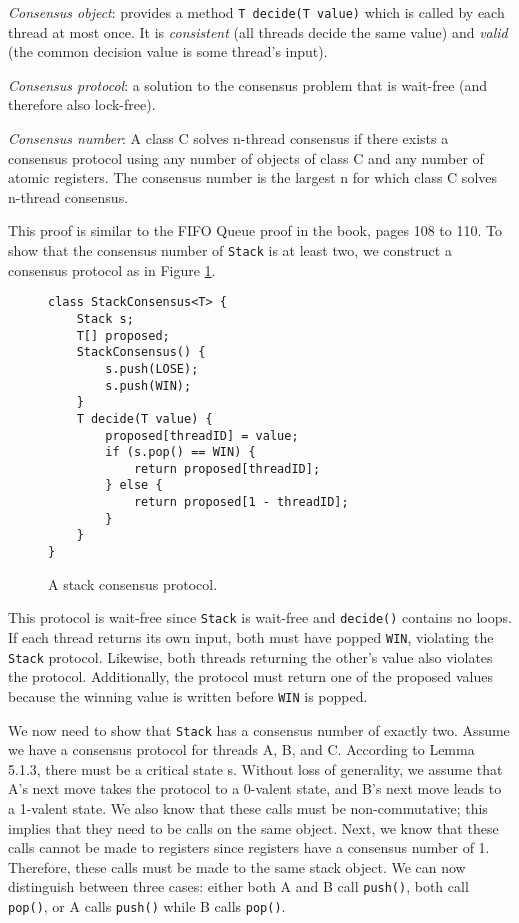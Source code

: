 \documentclass[a4paper,10pt]{article}
\begin{document}
\vspace{3mm}

\emph{Consensus object}: provides a method \lstinline|T decide(T value)| which is called by each thread at most once. It is \emph{consistent} (all threads decide the same value) and \emph{valid} (the common decision value is some thread's input).

\emph{Consensus protocol}: a solution to the consensus problem that is wait-free (and therefore also lock-free).

\emph{Consensus number}: A class C solves n-thread consensus if there exists a consensus protocol using any number of objects of class C and any number of atomic registers. The consensus number is the largest n for which class C solves n-thread consensus.

This proof is similar to the FIFO Queue proof in the book, pages 108 to 110. To show that the consensus number of \lstinline|Stack| is at least two, we construct a consensus protocol as in Figure \ref{fig:stackconsensus}.

\begin{figure}
\begin{lstlisting}
class StackConsensus<T> {
    Stack s;
    T[] proposed;
    StackConsensus() {
        s.push(LOSE);
        s.push(WIN);
    }
    T decide(T value) {
        proposed[threadID] = value;
        if (s.pop() == WIN) {
            return proposed[threadID];
        } else {
            return proposed[1 - threadID];
        }
    }
}
\end{lstlisting}
\caption{A stack consensus protocol.}
\label{fig:stackconsensus}
\end{figure}

This protocol is wait-free since \lstinline|Stack| is wait-free and \lstinline|decide()| contains no loops. If each thread returns its own input, both must have popped \lstinline|WIN|, violating the \lstinline|Stack| protocol. Likewise, both threads returning the other's value also violates the protocol. Additionally, the protocol must return one of the proposed values because the winning value is written before \lstinline|WIN| is popped.

We now need to show that \lstinline|Stack| has a consensus number of exactly two. Assume we have a consensus protocol for threads A, B, and C. According to Lemma 5.1.3, there must be a critical state s. Without loss of generality, we assume that A's next move takes the protocol to a 0-valent state, and B's next move leads to a 1-valent state. We also know that these calls must be non-commutative; this implies that they need to be calls on the same object. Next, we know that these calls cannot be made to registers since registers have a consensus number of 1. Therefore, these calls must be made to the same stack object. We can now distinguish between three cases: either both A and B call \lstinline|push()|, both call \lstinline|pop()|, or A calls \lstinline|push()| while B calls \lstinline|pop()|.
\end{document}
